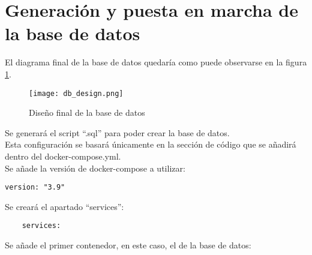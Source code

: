 \section{Generación y puesta en marcha de la base de datos}

El diagrama final de la base de datos quedaría como puede observarse en la figura \ref{fig:db-design}.
\begin{figure}[ht]
    \texttt{[image: db\_design.png]}
    \caption{Diseño final de la base de datos}\label{fig:db-design}
\end{figure}
Se generará el script ``.sql'' para poder crear la base de datos.
\\Esta configuración se basará únicamente en la sección de código que se añadirá dentro del docker-compose.yml.
\\Se añade la versión de docker-compose \cite{docker-compose-create} a utilizar:

\begin{verbatim}
version: "3.9"
\end{verbatim}

Se creará el apartado ``services'':

\begin{verbatim}
    services:
\end{verbatim}

Se añade el primer contenedor, en este caso, el de la base de datos:

